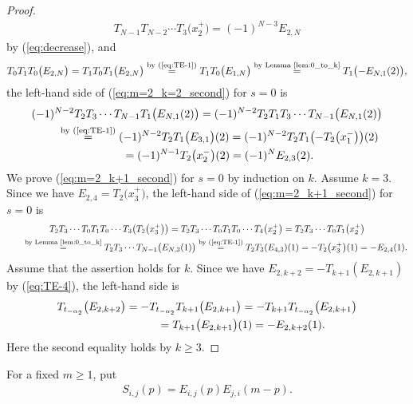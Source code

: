 \begin{proof}
\begin{gather*}
T_{N-1} T_{N-2} \cdots T_3 \big(x_2^+\big) = (-1)^{N-3} E_{2,N}
\end{gather*}
by (\ref{eq:decrease}), and
\begin{gather*}
T_0 T_1 T_0 \big(E_{2,N}\big) = T_1 T_0 T_1 \big(E_{2,N}\big) \overset{\text{by (\ref{eq:TE-1})}}{=} T_1 T_0 \big(E_{1,N}\big)
\overset{\text{by Lemma~\ref{lem:0_to_k}}}{=} T_1\big({-}E_{N,1}(2)\big),
\end{gather*}
the left-hand side of (\ref{eq:m=2_k=2_second}) for $s=0$ is
\begin{gather*}
(-1)^{N-2} T_2 T_3 \cdots T_{N-1} T_1 \big(E_{N,1}(2)\big) = (-1)^{N-2} T_2 T_1 T_3 \cdots T_{N-1} \big(E_{N,1}(2)\big) \\
\qquad{} \overset{\text{by (\ref{eq:TE-1})}}{=} (-1)^{N-2} T_2 T_1 \big(E_{3,1}\big) (2)= (-1)^{N-2} T_2 T_1 \big({-}T_2\big(x_1^-\big)\big)(2) \\
\qquad {} = (-1)^{N-1} T_2 \big(x_2^-\big)(2) = (-1)^N E_{2,3}(2).
\end{gather*}
We prove (\ref{eq:m=2_k+1_second}) for $s=0$ by induction on $k$. Assume $k=3$. Since we have $E_{2,4}=T_2\big(x_3^+\big)$, the left-hand side of (\ref{eq:m=2_k+1_second}) for $s=0$ is
\begin{gather*}
T_2 T_3 \cdots T_0 T_1 T_0 \cdots T_3\big(T_2\big(x_3^+\big)\big) = T_2 T_3 \cdots T_0 T_1 T_0 \cdots T_{4} \big(x_{2}^+\big) = T_2 T_3 \cdots T_0 T_1 \big(x_2^+\big) \\
\qquad \overset{\text{by Lemma~\ref{lem:0_to_k}}}{=} T_2 T_3 \cdots T_{N-1} \big(E_{N,3}(1)\big)\overset{\text{by (\ref{eq:TE-1})} }{=} T_2 T_3 (E_{4,3}) (1) = - T_2\big(x_3^+\big)(1) = -E_{2,4}(1).
\end{gather*}
Assume that the assertion holds for $k$.
Since we have $E_{2,k+2} = -T_{k+1}(E_{2,k+1})$ by (\ref{eq:TE-4}), the left-hand side is
\begin{gather*}
T_{t_{-\alpha_2}}\big(E_{2,k+2}\big) = -T_{t_{-\alpha_2}} T_{k+1}\big(E_{2,k+1}\big) = -T_{k+1} T_{t_{-\alpha_2}}\big(E_{2,k+1}\big)\\
\hphantom{T_{t_{-\alpha_2}}\big(E_{2,k+2}\big)}{} = T_{k+1} \big(E_{2,k+1}\big)(1) = -E_{2,k+2}(1).
\end{gather*}
Here the second equality holds by $k \geq 3$.
\end{proof}

For a fixed $m \geq 1$, put
\begin{gather*}
S_{i,j}(p) = E_{i,j}(p)E_{j,i}(m-p).
\end{gather*}

